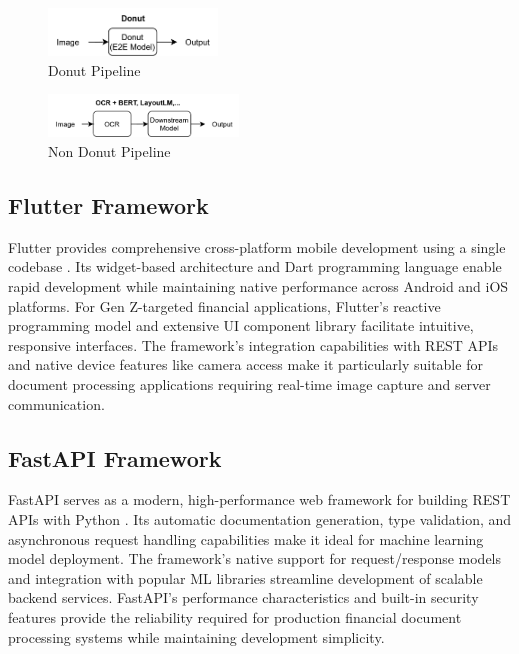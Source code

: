 \begin{figure}[htbp]
    \centerline{\includegraphics[width=0.4\textwidth]{images/donut-pipeline.png}}
    \caption{Donut Pipeline}
    \label{fig:donut_pipeline}
\end{figure}

\begin{figure}[htbp]
    \centerline{\includegraphics[width=0.45\textwidth]{images/non-donut-pipeline.png}}
    \caption{Non Donut Pipeline}
    \label{fig:non_donut_pipeline}
\end{figure}

\subsection{Flutter Framework}
Flutter provides comprehensive cross-platform mobile development using a single codebase \cite{flutter2021}. Its widget-based architecture and Dart programming language enable rapid development while maintaining native performance across Android and iOS platforms. For Gen Z-targeted financial applications, Flutter's reactive programming model and extensive UI component library facilitate intuitive, responsive interfaces. The framework's integration capabilities with REST APIs and native device features like camera access make it particularly suitable for document processing applications requiring real-time image capture and server communication.

\subsection{FastAPI Framework}
FastAPI serves as a modern, high-performance web framework for building REST APIs with Python \cite{ramirez2020fastapi}. Its automatic documentation generation, type validation, and asynchronous request handling capabilities make it ideal for machine learning model deployment. The framework's native support for request/response models and integration with popular ML libraries streamline development of scalable backend services. FastAPI's performance characteristics and built-in security features provide the reliability required for production financial document processing systems while maintaining development simplicity.

